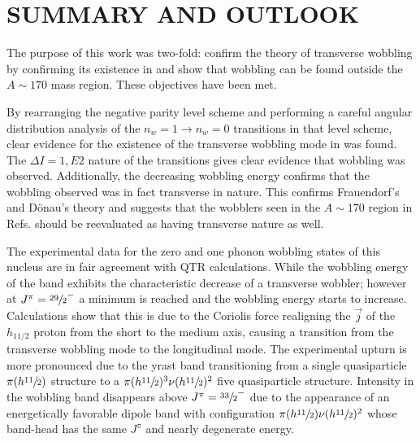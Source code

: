 %
%

\chapter{SUMMARY AND OUTLOOK}
\label{chp:wob-disc}

The purpose of this work was two-fold: confirm the theory of transverse wobbling by confirming its existence in \pr{} and show that wobbling can be found outside the $A\sim{}170$ mass region. These objectives have been met.

By rearranging the negative parity level scheme and performing a careful angular distribution analysis of the $n_w=1\rightarrow{}n_w=0$ transitions in that level scheme, clear evidence for the existence of the transverse wobbling mode in \pr{} was found. The $\Delta{}I=1, E2$ nature of the transitions gives clear evidence that wobbling was observed. Additionally, the decreasing wobbling energy confirms that the wobbling observed was in fact transverse in nature. This confirms Frauendorf's and D\"onau's theory and suggests that the wobblers seen in the $A\sim{}170$ region in Refs. \cite{wobblingIn163Lu,wobblingIn163LuTwoPhonon,wobblingIn165Lu,wobblingIn167Lu,wobblingIn161Lu,wobblingIn167Ta} should be reevaluated as having transverse nature as well.

The experimental data for the zero and one phonon wobbling states of this nucleus are in fair agreement with QTR calculations. While the wobbling energy of the band exhibits the characteristic decrease of a transverse wobbler; however at $J^{\pi}=\sfrac{29}{2}^-$ a minimum is reached and the wobbling energy starts to increase. Calculations show that this is due to the Coriolis force realigning the $\vec{j}$ of the $h_{11/2}$ proton from the short to the medium axis, causing a transition from the transverse wobbling mode to the longitudinal mode. The experimental upturn is more pronounced due to the yrast band transitioning from a single quasiparticle $\pi{}(h\sfrac{11}{2})$ structure to a $\pi{}(h\sfrac{11}{2})^3\nu{}(h\sfrac{11}{2})^2$ five quasiparticle structure. Intensity in the wobbling band disappears above $J^{\pi}=\sfrac{33}{2}^-$ due to the appearance of an energetically favorable dipole band with configuration $\pi{}(h\sfrac{11}{2})\nu{}(h\sfrac{11}{2})^2$ whose band-head has the same $J^{\pi}$ and nearly degenerate energy.

